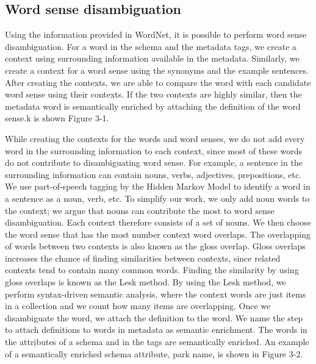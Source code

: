 \subsection{Word sense disambiguation}

Using the information provided in WordNet, it is possible to perform word sense disambiguation. For a word in the schema and the metadata tags, we create a context using surrounding information available in the metadata. Similarly, we create a context for a word sense using the synonyms and the example sentences. After creating the contexts, we are able to compare the word with each candidate word sense using their contexts. If the two contexts are highly similar, then the metadata word is semantically enriched by attaching the definition of the word sense.k is shown Figure 3-1.

While creating the contexts for the words and word senses, we do not add every word in the surrounding information to each context, since most of these words do not contribute to disambiguating word sense. For example, a sentence in the surrounding information can contain nouns, verbs, adjectives, prepositions, etc. We use part-of-speech tagging by the Hidden Markov Model to identify a word in a sentence as a noun, verb, etc. To simplify our work, we only add noun words to the context; we argue that nouns can contribute the most to word sense disambiguation. Each context therefore consists of a set of nouns. We then choose the word sense that has the most number context word overlaps.
The overlapping of words between two contexts is also known as the gloss overlap. Gloss overlaps increases the chance of finding similarities between contexts, since related contexts tend to contain many common words. Finding the similarity by using gloss overlaps is known as the Lesk method. By using the Lesk method, we perform syntax-driven semantic analysis, where the context words are just items in a collection and we count how many items are overlapping.
Once we disambiguate the word, we attach the definition to the word. We name the step to attach definitions to words in metadata as semantic enrichment. The words in the attributes of a schema and in the tags are semantically enriched. An example of a semantically enriched schema attribute, park name, is shown in Figure 3-2.

